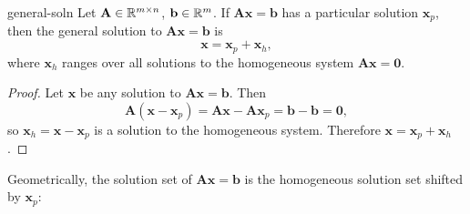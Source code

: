 \begin{theorem}{}{general-soln}
  Let $\mathbf{A} \in \mathbb{R}^{m \times n}$, $\mathbf{b} \in \mathbb{R}^m$. If $\mathbf{A}\mathbf{x} = \mathbf{b}$ has a particular solution $\mathbf{x}_p$, then the general solution to $\mathbf{A}\mathbf{x} = \mathbf{b}$ is
  \[
    \mathbf{x} = \mathbf{x}_p + \mathbf{x}_h,
  \]
  where $\mathbf{x}_h$ ranges over all solutions to the homogeneous system $\mathbf{A}\mathbf{x} = \mathbf{0}$.
\end{theorem}

\begin{proof}
  Let $\mathbf{x}$ be any solution to $\mathbf{A}\mathbf{x} = \mathbf{b}$. Then
  \[
    \mathbf{A}(\mathbf{x} - \mathbf{x}_p) = \mathbf{A}\mathbf{x} - \mathbf{A}\mathbf{x}_p = \mathbf{b} - \mathbf{b} = \mathbf{0},
  \]
  so $\mathbf{x}_h = \mathbf{x} - \mathbf{x}_p$ is a solution to the homogeneous system. Therefore $\mathbf{x} = \mathbf{x}_p + \mathbf{x}_h$.
\end{proof}

Geometrically, the solution set of $\mathbf{A}\mathbf{x} = \mathbf{b}$ is the homogeneous solution set shifted by $\mathbf{x}_p$:

\begin{center}
\end{center}

